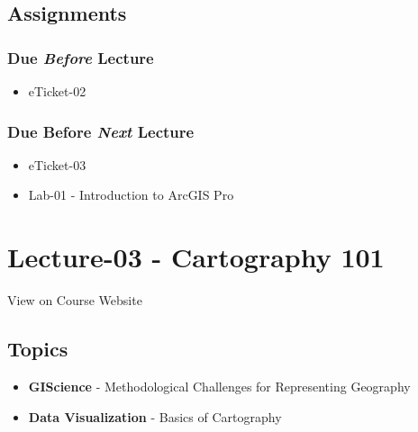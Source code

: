\documentclass[]{book}
\providecommand{\tightlist}{%
  \setlength{\itemsep}{0pt}\setlength{\parskip}{0pt}}
\begin{document}
\hypertarget{assignments-3}{%
\subsection*{Assignments}\label{assignments-3}}

\hypertarget{due-before-lecture-1}{%
\subsubsection*{\texorpdfstring{Due \emph{Before} Lecture}{Due Before Lecture}}\label{due-before-lecture-1}}

\begin{itemize}
\tightlist
\item
  eTicket-02
\end{itemize}

\hypertarget{due-before-next-lecture}{%
\subsubsection*{\texorpdfstring{Due Before \emph{Next} Lecture}{Due Before Next Lecture}}\label{due-before-next-lecture}}

\begin{itemize}
\tightlist
\item
  eTicket-03
\item
  Lab-01 - Introduction to ArcGIS Pro
\end{itemize}

\hypertarget{lecture-03---cartography-101}{%
\section*{Lecture-03 - Cartography 101}\label{lecture-03---cartography-101}}

View on Course Website

\hypertarget{topics-3}{%
\subsection*{Topics}\label{topics-3}}

\begin{itemize}
\tightlist
\item
  \textbf{GIScience} - Methodological Challenges for Representing Geography
\item
  \textbf{Data Visualization} - Basics of Cartography
\end{itemize}
\end{document}
